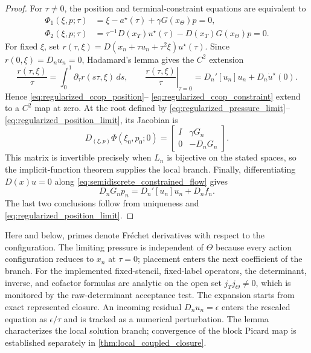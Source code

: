 \documentclass[11pt]{article}
\theoremstyle{plain}
\theoremstyle{definition}
\theoremstyle{remark}
\newcommand{\Th}{\Theta}
\begin{document}
\begin{proof}
For $\tau\ne0$, the position and terminal-constraint equations are equivalent
to
\begin{align}
 \Phi_1(\xi,p;\tau)
 &=\xi-a^\star(\tau)+\gamma G(x_\Th)p=0,
 \label{eq:regularized_ccop_position}\\
 \Phi_2(\xi,p;\tau)
 &=\tau^{-1}D(x_T)u^\star(\tau)-D(x_T)G(x_\Th)p=0.
 \label{eq:regularized_ccop_constraint}
\end{align}
For fixed $\xi$, set
$r(\tau,\xi)=D(x_n+\tau u_n+\tau^2\xi)u^\star(\tau)$.
Since $r(0,\xi)=D_nu_n=0$, Hadamard's lemma gives the $C^2$ extension
\begin{equation}
 \frac{r(\tau,\xi)}{\tau}
 =\int_0^1\partial_\tau r(s\tau,\xi)\,ds,
 \qquad
 \left.\frac{r(\tau,\xi)}{\tau}\right|_{\tau=0}
 =D_n'[u_n]u_n+D_n\dot u^\star(0).
 \label{eq:hadamard_constraint_extension}
\end{equation}
Hence \eqref{eq:regularized_ccop_position}--
\eqref{eq:regularized_ccop_constraint} extend to a $C^2$ map at zero.  At the
root defined by \eqref{eq:regularized_pressure_limit}--
\eqref{eq:regularized_position_limit}, its Jacobian is
\begin{equation}
 D_{(\xi,p)}\Phi(\xi_0,p_0;0)
 =\begin{bmatrix}
 I & \gamma G_n\\
 0 & -D_nG_n
 \end{bmatrix}.
 \label{eq:regularized_ccop_jacobian}
\end{equation}
This matrix is invertible precisely when $L_n$ is bijective on the stated
spaces, so the implicit-function theorem supplies the local branch.  Finally,
differentiating $D(x)u=0$ along
\eqref{eq:semidiscrete_constrained_flow} gives
\begin{equation*}
 D_nG_np_n=D_n'[u_n]u_n+D_nf_n.
\end{equation*}
The last two conclusions follow from uniqueness and
\eqref{eq:regularized_position_limit}.
\end{proof}

Here and below, primes denote Fr\'echet derivatives with respect to the
configuration.  The limiting pressure is independent of $\Th$ because every action
configuration reduces to $x_n$ at $\tau=0$; placement enters the next
coefficient of the branch.  For the implemented fixed-stencil, fixed-label
operators, the determinant, inverse, and cofactor formulas are analytic on the
open set $j_Tj_\Th\ne0$, which is monitored by the raw-determinant acceptance
test.  The expansion starts from exact represented closure.  An incoming
residual $D_nu_n=\epsilon$ enters the rescaled equation as
$\epsilon/\tau$ and is tracked as a numerical perturbation.  The lemma
characterizes the local solution branch; convergence of the block Picard map
is established separately in \cref{thm:local_coupled_closure}.
\end{document}
